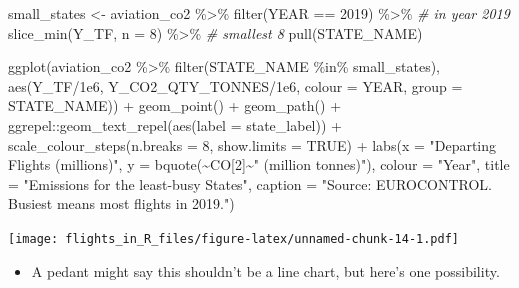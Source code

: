 \documentclass[
]{book}
\newenvironment{Shaded}{\begin{snugshade}}{\end{snugshade}}
\newcommand{\AttributeTok}[1]{\textcolor[rgb]{0.77,0.63,0.00}{#1}}
\newcommand{\CommentTok}[1]{\textcolor[rgb]{0.56,0.35,0.01}{\textit{#1}}}
\newcommand{\ConstantTok}[1]{\textcolor[rgb]{0.00,0.00,0.00}{#1}}
\newcommand{\DecValTok}[1]{\textcolor[rgb]{0.00,0.00,0.81}{#1}}
\newcommand{\FloatTok}[1]{\textcolor[rgb]{0.00,0.00,0.81}{#1}}
\newcommand{\FunctionTok}[1]{\textcolor[rgb]{0.00,0.00,0.00}{#1}}
\newcommand{\NormalTok}[1]{#1}
\newcommand{\OtherTok}[1]{\textcolor[rgb]{0.56,0.35,0.01}{#1}}
\newcommand{\SpecialCharTok}[1]{\textcolor[rgb]{0.00,0.00,0.00}{#1}}
\newcommand{\StringTok}[1]{\textcolor[rgb]{0.31,0.60,0.02}{#1}}
\providecommand{\tightlist}{%
  \setlength{\itemsep}{0pt}\setlength{\parskip}{0pt}}
\begin{document}
\begin{Shaded}
\begin{Highlighting}[]
\NormalTok{small\_states }\OtherTok{\textless{}{-}}\NormalTok{ aviation\_co2 }\SpecialCharTok{\%\textgreater{}\%} 
  \FunctionTok{filter}\NormalTok{(YEAR }\SpecialCharTok{==} \DecValTok{2019}\NormalTok{) }\SpecialCharTok{\%\textgreater{}\%}     \CommentTok{\#  in year 2019}
  \FunctionTok{slice\_min}\NormalTok{(Y\_TF, }\AttributeTok{n =} \DecValTok{8}\NormalTok{) }\SpecialCharTok{\%\textgreater{}\%}  \CommentTok{\# smallest 8 }
  \FunctionTok{pull}\NormalTok{(STATE\_NAME)}

\FunctionTok{ggplot}\NormalTok{(aviation\_co2 }\SpecialCharTok{\%\textgreater{}\%} 
         \FunctionTok{filter}\NormalTok{(STATE\_NAME }\SpecialCharTok{\%in\%}\NormalTok{ small\_states), }
       \FunctionTok{aes}\NormalTok{(Y\_TF}\SpecialCharTok{/}\FloatTok{1e6}\NormalTok{, Y\_CO2\_QTY\_TONNES}\SpecialCharTok{/}\FloatTok{1e6}\NormalTok{, }
           \AttributeTok{colour =}\NormalTok{ YEAR, }\AttributeTok{group =}\NormalTok{ STATE\_NAME)) }\SpecialCharTok{+}
  \FunctionTok{geom\_point}\NormalTok{() }\SpecialCharTok{+} 
  \FunctionTok{geom\_path}\NormalTok{() }\SpecialCharTok{+}
\NormalTok{  ggrepel}\SpecialCharTok{::}\FunctionTok{geom\_text\_repel}\NormalTok{(}\FunctionTok{aes}\NormalTok{(}\AttributeTok{label =}\NormalTok{ state\_label)) }\SpecialCharTok{+}
  \FunctionTok{scale\_colour\_steps}\NormalTok{(}\AttributeTok{n.breaks =} \DecValTok{8}\NormalTok{, }\AttributeTok{show.limits =} \ConstantTok{TRUE}\NormalTok{) }\SpecialCharTok{+}
  \FunctionTok{labs}\NormalTok{(}\AttributeTok{x =} \StringTok{"Departing Flights (millions)"}\NormalTok{, }
       \AttributeTok{y =} \FunctionTok{bquote}\NormalTok{(}\SpecialCharTok{\textasciitilde{}}\NormalTok{CO[}\DecValTok{2}\NormalTok{]}\SpecialCharTok{\textasciitilde{}}\StringTok{" (million tonnes)"}\NormalTok{),}
       \AttributeTok{colour =} \StringTok{"Year"}\NormalTok{,}
       \AttributeTok{title =} \StringTok{"Emissions for the least{-}busy States"}\NormalTok{,}
       \AttributeTok{caption =} \StringTok{"Source: EUROCONTROL. \textquotesingle{}Busiest\textquotesingle{} means most flights in 2019."}\NormalTok{)}
\end{Highlighting}
\end{Shaded}

\texttt{[image: flights\_in\_R\_files/figure-latex/unnamed-chunk-14-1.pdf]}

\begin{itemize}
\tightlist
\item
  A pedant might say this shouldn't be a line chart, but here's one possibility.
\end{itemize}
\end{document}
